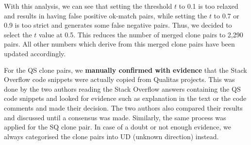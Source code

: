 \documentclass[a4paper,twoside,10pt]{reviewresponse}
\begin{document}
With this analysis, we can see that setting the threshold $t$ to 0.1 is too relaxed and results in having false positive ok-match pairs, while setting the $t$ to 0.7 or 0.9 is too strict and generates some false negative pairs. Thus, we decided to select the $t$ value at 0.5. This reduces the number of merged clone pairs to 2,290 pairs. All other numbers which derive from this merged clone pairs have been updated accordingly.


For the QS clone pairs, we \textbf{manually confirmed with evidence} that the Stack Overflow code snippets were actually copied from Qualitas projects. This was done by the two authors reading the Stack Overflow answers containing the QS code snippets and looked for evidence such as explanation in the text or the code comments and made their decision. The two authors also compared their results and discussed until a consensus was made. Similarly, the same process was applied for the SQ clone pair. 
In case of a doubt or not enough evidence, we always categorised the clone pairs into UD (unknown direction) instead. 
\end{document}
